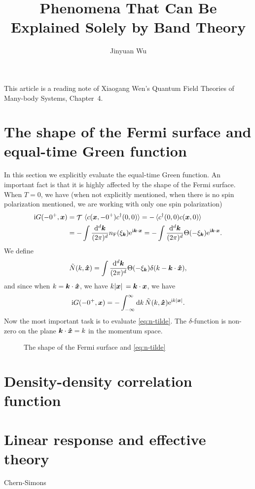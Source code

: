 \documentclass[hyperref, a4paper]{article}
\title{Phenomena That Can Be Explained Solely by Band Theory}
\author{Jinyuan Wu}
\DeclareMathOperator{\timeorder}{\mathcal{T}}
\newcommand*{\ii}{\mathrm{i}}
\newcommand*{\ee}{\mathrm{e}}
\begin{document}
\maketitle

This article is a reading note of Xiaogang Wen's Quantum Field Theories of Many-body Systems, Chapter~4.

\section{The shape of the Fermi surface and equal-time Green function}

In this section we explicitly evaluate the equal-time Green function.  
An important fact is that it is highly affected by the shape of the Fermi surface. When $T=0$, we have 
(when not explicitly mentioned, when there is no spin polarization mentioned, we are working with only 
one spin polarization)
\begin{equation} 
    \begin{aligned}
        \ii G(-0^+, \vb*{x}) &= \timeorder \expval*{c(\vb*{x}, -0^+) c^\dagger(0, 0)} = - \expval*{c^\dagger(0, 0) c(\vb*{x}, 0)} \\
        &= - \int \frac{\dd[d]{\vb*{k}}}{(2\pi)^d} n_\text{F}(\xi_{\vb*{k}}) \ee^{\ii \vb*{k} \cdot \vb*{x}}
        = - \int \frac{\dd[d]{\vb*{k}}}{(2\pi)^d} \Theta(-\xi_{\vb*{k}}) \ee^{\ii \vb*{k} \cdot \vb*{x}}.
    \end{aligned}
\end{equation}
We define 
\begin{equation}
    \tilde{N}(k, \vu*{x}) = \int \frac{\dd[d]{\vb*{k}}}{(2\pi)^d} \Theta(-\xi_{\vb*{k}}) \delta(k - \vb*{k} \cdot \vu*{x}),
    \label{eq:n-tilde}
\end{equation}
and since when $k = \vb*{k} \cdot \vu*{x}$, we have $k \abs*{\vb*{x}} = \vb*{k} \cdot \vb*{x}$, we have 
\begin{equation}
    \ii G(-0^+, \vb*{x}) = - \int_{-\infty}^\infty \dd{k} \tilde{N}(k, \vu*{x}) \ee^{\ii k \abs*{\vb*{x}}}.
\end{equation}
Now the most important task is to evaluate \eqref{eq:n-tilde}. The $\delta$-function is non-zero on the 
plane $\vb*{k} \cdot \vu*{x} = k$ in the momentum space. 

\begin{figure}
    \centering
    
    \caption{The shape of the Fermi surface and \eqref{eq:n-tilde}}
\end{figure}

\section{Density-density correlation function}

\section{Linear response and effective theory}

Chern-Simons
\end{document}
